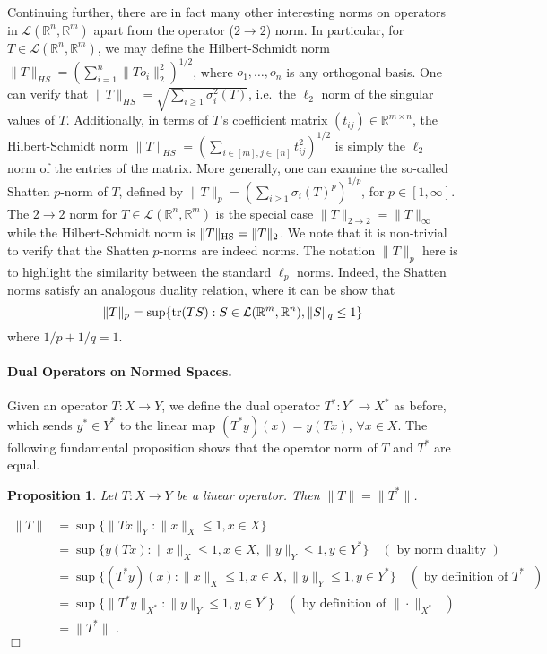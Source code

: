 \documentclass[11pt]{article}
\newtheorem{proposition}[theorem]{Proposition}
\theoremstyle{plain}
\newenvironment{proof}{\noindent {\sc Proof:}}{$\Box$ \medskip}
\theoremstyle{plain}
\newcommand{\set}[1]{\{{#1}\}}
\newcommand{\R}{\ensuremath{\mathbb{R}}}
\begin{document}
Continuing further, there are in fact many other interesting norms on operators
in $\mathcal{L}(\R^n,\R^m)$ apart from the operator ($2 \rightarrow 2$) norm. In
particular, for $T \in \mathcal{L}(\R^n,\R^m)$, we may define the
Hilbert-Schmidt norm $\|T\|_{HS} = (\sum_{i=1}^n \|T o_i\|_2^2)^{1/2}$, where
$o_1,\dots,o_n$ is any orthogonal basis. One can verify that $\|T\|_{HS} =
\sqrt{\sum_{i \geq 1} \sigma_i^2(T)}$, i.e.~the $\ell_2$ norm of the singular
values of $T$. Additionally, in terms of $T$'s coefficient matrix $(t_{ij}) \in
\R^{m \times n}$, the Hilbert-Schmidt norm $\|T\|_{HS} = (\sum_{i \in [m], j \in
[n]} t_{ij}^2)^{1/2}$ is simply the $\ell_2$ norm of the entries of the matrix.
More generally, one can examine the so-called Shatten $p$-norm of $T$, defined
by $\|T\|_p = (\sum_{i \geq 1} \sigma_i(T)^p)^{1/p}$, for $p \in [1,\infty]$.
The $2 \rightarrow 2$ norm for $T \in \mathcal{L}(\R^n,\R^m)$ is the special
case $\|T\|_{2 \rightarrow 2} = \|T\|_{\infty}$ while the Hilbert-Schmidt norm
is $\|T\|_{\rm HS} = \|T\|_{2}$. We note that it is non-trivial to verify that
the Shatten $p$-norms are indeed norms. The notation $\|T\|_p$ here is to
highlight the similarity between the standard $\ell_p$ norms. Indeed, the
Shatten norms satisfy an analogous duality relation, where it can be show that
\[
\|T\|_{p} = \sup \set{{\rm tr}(T S): S \in \mathcal{L}(\R^m,\R^n), \|S\|_q \leq 1}
\]
where $1/p + 1/q = 1$. 

\paragraph{\bf Dual Operators on Normed Spaces.} Given an operator $T: X
\rightarrow Y$, we define the dual operator $T^*: Y^* \rightarrow X^*$ as
before, which sends $y^* \in Y^*$ to the linear map $(T^* y)(x) = y(Tx)$,
$\forall x \in X$. The following fundamental proposition shows that the operator
norm of $T$ and $T^*$ are equal.   

\begin{proposition} Let $T: X \rightarrow Y$ be a linear operator. Then $\|T\| =
\|T^*\|$.
\end{proposition}
\begin{proof}
\begin{align*}
\|T\| &= \sup \set{\|Tx\|_Y: \|x\|_X \leq 1, x \in X} \\
      &= \sup \set{y(Tx): \|x\|_X \leq 1, x \in X, \|y\|_Y \leq 1, y \in Y^*}
\quad \left(\text{ by norm duality }\right) \\
      &= \sup \set{(T^*y)(x): \|x\|_X \leq 1, x \in X, \|y\|_Y \leq 1, y \in Y^*} 
\quad \left(\text{ by definition of $T^*$ }\right) \\
      &= \sup \set{\|T^*y\|_{X^*}: \|y\|_Y \leq 1, y \in Y^*} 
\quad \left(\text{ by definition of $\|\cdot\|_{X^*}$ }\right) \\
      &= \|T^*\| \text{ .}
\end{align*}
\end{proof}
\end{document}
